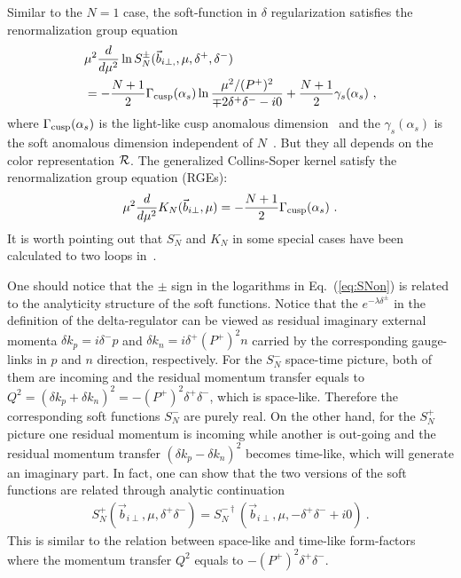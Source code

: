 \documentclass[twocolumn,superscriptaddress,longbibliography,10pt]{revtex4-1}
\begin{document}
Similar to the $N=1$ case,  the soft-function in $\delta$ regularization satisfies the renormalization group equation
\begin{align}
&\mu^2\frac{d}{d\mu^2}\ln S^{\pm}_{N}(\vec{b}_{i\perp,},\mu,\delta^+,\delta^-)\nonumber \\
&=-\frac{N+1}{2}\Gamma_{\rm cusp}(\alpha_s)\ln \frac{\mu^2/(P^+)^2}{\mp 2\delta^+\delta^--i0} + \frac{N+1}{2}\gamma_s(\alpha_s)\ ,
\end{align}
where $\Gamma_{\rm cusp}(\alpha_s) $ is the light-like cusp anomalous dimension~\cite{Polyakov:1980ca,Korchemsky:1987wg} and the $\gamma_s(\alpha_s)$ is the soft anomalous dimension independent of $N$~\cite{Korchemskaya:1992je}. But they all depends on the color representation ${\cal R}$. The generalized Collins-Soper kernel satisfy the renormalization group equation (RGEs):
\begin{align}
\mu^2\frac{d}{d\mu^2} K_N(\vec{b}_{i\perp},\mu)=-\frac{N+1}{2}\Gamma_{\rm cusp}(\alpha_s) \label{eq:cusp} \ .
\end{align}
It is worth pointing out that $S_N^{-}$ and $K_N$ in some special cases have been calculated to two loops in~\cite{Vladimirov:2016qkd}.

One should notice that the $\pm$ sign in the logarithms in Eq.~(\ref{eq:SNon}) is related to the analyticity structure of the soft functions. Notice that the $e^{-\lambda \delta^{\pm}}$ in the definition of the delta-regulator can be viewed as residual imaginary external momenta $\delta k_p=i\delta^{-}p$ and $\delta k_n=i\delta^{+} (P^+)^2n $ carried by the corresponding gauge-links in $p$ and $n$ direction, respectively. For the $S_N^-$ space-time picture, both of them are incoming and the residual momentum transfer equals to $Q^2=(\delta k_p+\delta k_n)^2=-(P^+)^2\delta^+\delta^-$, which is space-like. Therefore the corresponding soft functions $S_N^-$ are purely real.  On the other hand, for the $S_N^+$ picture one residual momentum is incoming while another is out-going and the residual momentum transfer $(\delta k_p-\delta k_n)^2$ becomes time-like, which will generate an imaginary part. In fact, one can show that the two versions of the soft functions are related through analytic continuation
\begin{align}
    S^{+}_N(\vec{b}_{i\perp},\mu,\delta^+\delta^-)=S^{-\dagger}_N(\vec{b}_{i\perp},\mu,-\delta^+\delta^-+i0) \ .
\end{align}
This is similar to the relation between space-like and time-like form-factors~\cite{Collins:2016hqq} where the momentum transfer $Q^2$ equals to $-(P^+)^2\delta^+\delta^-$.
\end{document}

